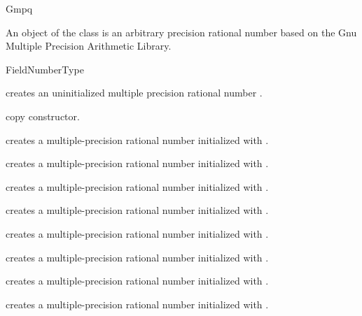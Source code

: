 \begin{ccRefClass} {Gmpq}
\label{Gmpq}

\ccDefinition

An object of the class  is an arbitrary precision rational
number based on the {\sc Gnu} Multiple Precision Arithmetic Library. 


\ccIsModel
FieldNumberType

\ccTypes


\ccCreation
{}

             {creates an uninitialized multiple precision rational number \ccVar.}

\ccHidden {}
            {copy constructor.}

            {creates a multiple-precision rational number initialized with
             .}

            {creates a multiple-precision rational number initialized with
             .}

            {creates a multiple-precision rational number initialized with
             .}

            {creates a multiple-precision rational number initialized with
             .}

            {creates a multiple-precision rational number initialized with
             .}

            {creates a multiple-precision rational number initialized with
             .}

            {creates a multiple-precision rational number initialized with
             .}

            {creates a multiple-precision rational number initialized with
             .}



\end{ccRefClass}
